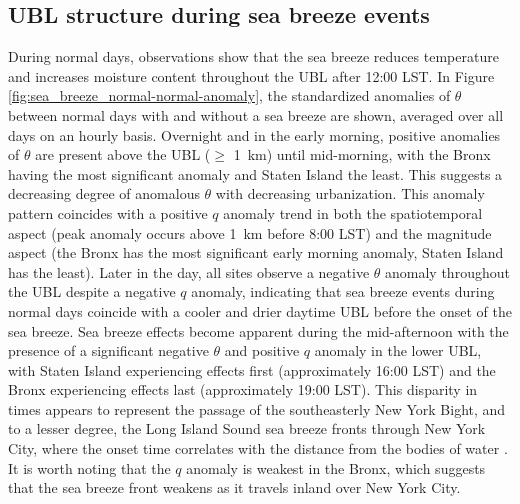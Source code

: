 \subsection{UBL structure during sea breeze events}
During normal days, observations show that the sea breeze reduces temperature and increases moisture content throughout the UBL after 12:00 LST. In Figure \ref{fig:sea_breeze_normal-normal-anomaly}, the standardized anomalies of $\theta$ between normal days with and without a sea breeze are shown, averaged over all days on an hourly basis. Overnight and in the early morning, positive anomalies of $\theta$ are present above the UBL ($\geq$ \SI{1}{\kilo\meter}) until mid-morning, with the Bronx having the most significant anomaly and Staten Island the least. This suggests a decreasing degree of anomalous $\theta$ with decreasing urbanization. This anomaly pattern coincides with a positive $q$ anomaly trend in both the spatiotemporal aspect (peak anomaly occurs above \SI{1}{\kilo\meter} before 8:00 LST) and the magnitude aspect (the Bronx has the most significant early morning anomaly, Staten Island has the least). Later in the day, all sites observe a negative $\theta$ anomaly throughout the UBL despite a negative $q$ anomaly, indicating that sea breeze events during normal days coincide with a cooler and drier daytime UBL before the onset of the sea breeze. Sea breeze effects become apparent during the mid-afternoon with the presence of a significant negative $\theta$ and positive $q$ anomaly in the lower UBL, with Staten Island experiencing effects first (approximately 16:00 LST) and the Bronx experiencing effects last (approximately 19:00 LST). This disparity in times appears to represent the passage of the southeasterly New York Bight, and to a lesser degree, the Long Island Sound sea breeze fronts through New York City, where the onset time correlates with the distance from the bodies of water \citep{bornstein1981}. It is worth noting that the $q$ anomaly is weakest in the Bronx, which suggests that the sea breeze front weakens as it travels inland over New York City.
\\ \\
